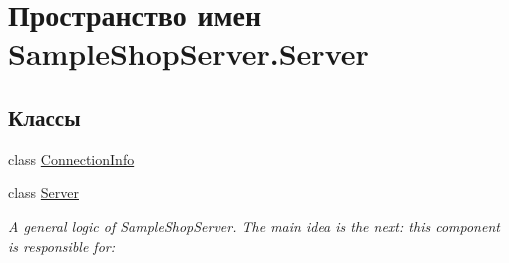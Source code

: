 \hypertarget{namespace_sample_shop_server_1_1_server}{}\section{Пространство имен Sample\+Shop\+Server.\+Server}
\label{namespace_sample_shop_server_1_1_server}
\subsection*{Классы}
\begin{DoxyCompactItemize}
\item 
class \hyperlink{class_sample_shop_server_1_1_server_1_1_connection_info}{Connection\+Info}
\item 
class \hyperlink{class_sample_shop_server_1_1_server_1_1_server}{Server}
\begin{DoxyCompactList}\small\item\em A general logic of Sample\+Shop\+Server. The main idea is the next\+: this component is responsible for\+: \end{DoxyCompactList}\end{DoxyCompactItemize}
